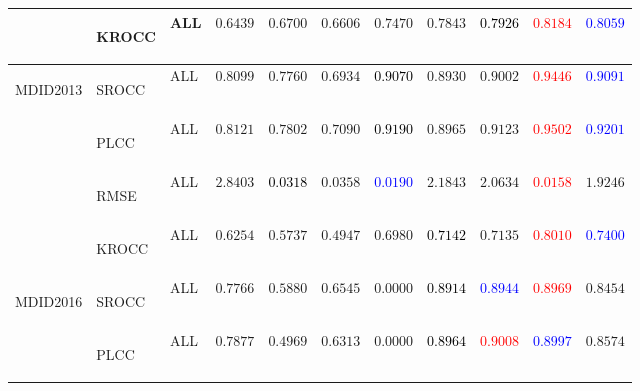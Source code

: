 \documentclass{article}
\begin{document}
\begin{table}
\begin{tabular}{||l|l|l||cccccccc||}
\cmidrule{2-11}\cmidrule{2-11}
&\multirow{1}{*}{\begin{turn}{-90}KROCC\end{turn}}&ALL&$0.6439$&$0.6700$&$0.6606$&$0.7470$&$0.7843$&\textbf{\textcolor{black}{$0.7926$}}&\textbf{\textcolor{red}{$0.8184$}}&\textbf{\textcolor{blue}{$0.8059$}}\\
\midrule\midrule
\multirow{4}{*}{\begin{turn}{-90}MDID2013\end{turn}}&\multirow{1}{*}{\begin{turn}{-90}SROCC\end{turn}}&ALL&$0.8099$&$0.7760$&$0.6934$&\textbf{\textcolor{black}{$0.9070$}}&$0.8930$&$0.9002$&\textbf{\textcolor{red}{$0.9446$}}&\textbf{\textcolor{blue}{$0.9091$}}\\
\cmidrule{2-11}\cmidrule{2-11}
&\multirow{1}{*}{\begin{turn}{-90}PLCC\end{turn}}&ALL&$0.8121$&$0.7802$&$0.7090$&\textbf{\textcolor{black}{$0.9190$}}&$0.8965$&$0.9123$&\textbf{\textcolor{red}{$0.9502$}}&\textbf{\textcolor{blue}{$0.9201$}}\\
\cmidrule{2-11}\cmidrule{2-11}
&\multirow{1}{*}{\begin{turn}{-90}RMSE\end{turn}}&ALL&$2.8403$&\textbf{\textcolor{black}{$0.0318$}}&$0.0358$&\textbf{\textcolor{blue}{$0.0190$}}&$2.1843$&$2.0634$&\textbf{\textcolor{red}{$0.0158$}}&$1.9246$\\
\cmidrule{2-11}\cmidrule{2-11}
&\multirow{1}{*}{\begin{turn}{-90}KROCC\end{turn}}&ALL&$0.6254$&$0.5737$&$0.4947$&$0.6980$&\textbf{\textcolor{black}{$0.7142$}}&$0.7135$&\textbf{\textcolor{red}{$0.8010$}}&\textbf{\textcolor{blue}{$0.7400$}}\\
\midrule\midrule
\multirow{4}{*}{\begin{turn}{-90}MDID2016\end{turn}}&\multirow{1}{*}{\begin{turn}{-90}SROCC\end{turn}}&ALL&$0.7766$&$0.5880$&$0.6545$&$0.0000$&\textbf{\textcolor{black}{$0.8914$}}&\textbf{\textcolor{blue}{$0.8944$}}&\textbf{\textcolor{red}{$0.8969$}}&$0.8454$\\
\cmidrule{2-11}\cmidrule{2-11}
&\multirow{1}{*}{\begin{turn}{-90}PLCC\end{turn}}&ALL&$0.7877$&$0.4969$&$0.6313$&$0.0000$&\textbf{\textcolor{black}{$0.8964$}}&\textbf{\textcolor{red}{$0.9008$}}&\textbf{\textcolor{blue}{$0.8997$}}&$0.8574$\\

\end{tabular}
\end{table}
\end{document}

